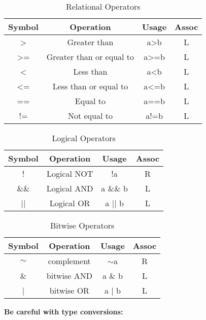\documentclass[answers,12pt,addpoints]{exam}
\begin{document}
\begin{table}[h!]
\centering
\begin{tabular}{|c|c|c|c|}
\hline
Symbol & Operation & Usage & Assoc \\ \hline
\textgreater & Greater than & a\textgreater b & L \\ \hline
\textgreater = & Greater than or equal to & a\textgreater =b & L \\ \hline
\textless & Less than & a\textless b & L \\ \hline
\textless = & Less than or equal to & a\textless =b & L \\ \hline
== & Equal to & a==b & L \\ \hline
!= & Not equal to & a!=b & L \\ \hline
\end{tabular}
\caption{Relational Operators}
\label{tab:relational-operators}
\end{table}

\begin{table}[h!]
\centering
\begin{tabular}{|c|c|c|c|}
\hline
Symbol & Operation & Usage & Assoc \\ \hline
! & Logical NOT & !a & R \\ \hline
\&\& & Logical AND & a \&\& b & L \\ \hline
|| & Logical OR & a || b & L \\ \hline
\end{tabular}
\caption{Logical Operators}
\label{tab:logical-operators}
\end{table}

\begin{table}[h!]
\centering
\begin{tabular}{|c|c|c|c|}
\hline
Symbol & Operation & Usage & Assoc \\ \hline
$\sim$ & complement & $\sim$a & R \\ \hline
\& & bitwise AND & a \& b & L \\ \hline
| & bitwise OR & a | b & L \\ \hline
\end{tabular}
\caption{Bitwise Operators}
\label{tab:bitwise-operators}
\end{table}

\textbf{Be careful with type conversions:} \\
\end{document}
